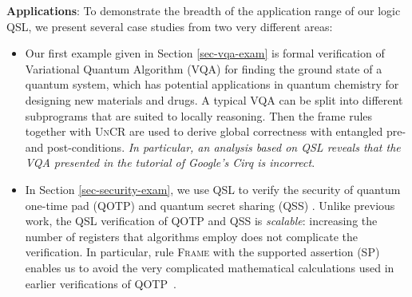 \documentclass[conference,compsoc, 10pt]{IEEEtran}
\begin{document}
	\textbf{Applications}: To demonstrate the breadth of the application range of our logic QSL, we present several case studies from two very different areas:
	\begin{itemize}
		\item Our first example given in Section \ref{sec-vqa-exam} is formal verification of Variational Quantum Algorithm (VQA) \cite{MRB16,PMS14} for finding the ground state of a quantum system, which has potential applications in quantum chemistry for designing new materials and drugs.
		A typical VQA can be split into different subprograms that are suited to locally reasoning. Then the frame rules together with \textsc{UnCR} are used to derive global correctness with entangled pre- and post-conditions. \textit{In particular, an analysis based on QSL reveals that the VQA presented in the tutorial of Google's Cirq \cite{Cirq} is incorrect}.  
		\item In Section \ref{sec-security-exam}, we use QSL to verify the security
      of quantum one-time pad (QOTP) \cite{BR03,MTW00} and quantum secret
      sharing (QSS) \cite{CGL99,HBB99}. Unlike previous work, the QSL
      verification of QOTP and QSS is \emph{scalable}: increasing the number of
      registers that algorithms employ does not complicate the verification. In
      particular, rule \textsc{Frame} with the supported assertion (SP) enables
      us to avoid the very complicated mathematical calculations used in earlier
      verifications of QOTP~\cite{BHY19}.
	\end{itemize}
	
	
\end{document}
